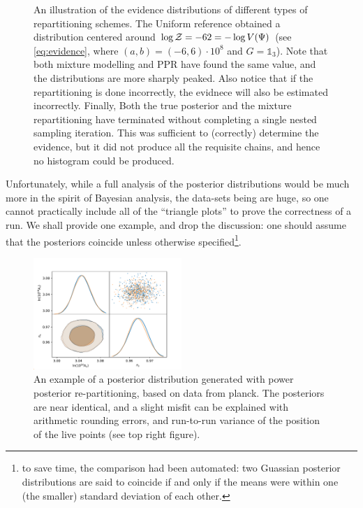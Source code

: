 \documentclass[usenatbib]{mnras}
\begin{document}
\begin{figure}

\caption{\label{org39c567e}
An illustration of the evidence distributions of different types of repartitioning schemes. The Uniform reference obtained a distribution centered around \(\log {\cal Z} = -62 = - \log V(\Psi)\) (see \autoref{eq:evidence}, where \((a,b)=(-6, 6)\cdot 10^{8}\) and \(G=\mathds{1}_{3}\)). Note that both mixture modelling and PPR have found the same value, and the distributions are more sharply peaked. Also notice that if the repartitioning is done incorrectly, the evidnece will also be estimated incorrectly. Finally, Both the true posterior and the mixture repartitioning have terminated without completing a single nested sampling iteration. This was sufficient to (correctly) determine the evidence, but it did not produce all the requisite chains, and hence no histogram could be produced.}
\end{figure}

Unfortunately, while a full analysis of the posterior distributions
would be much more in the spirit of Bayesian analysis, the data-sets
being are huge, so one cannot practically include all of
the ``triangle plots'' to prove the correctness of a run. We shall
provide one example, and drop the discussion: one should assume
that the posteriors coincide unless otherwise specified\footnote{to save time, the comparison had been automated: two Guassian
posterior distributions are said to coincide if and only if the means
were within one (the smaller) standard deviation  of each
other.}. 

\begin{figure}
 \includegraphics[width=0.5\textwidth]{./illustrations/misfit.pdf}
\caption{\label{org7fac775}
An example of a posterior distribution generated with power posterior re-partitioning, based on data from planck. The posteriors are near identical, and a slight misfit can be explained with arithmetic rounding errors, and run-to-run variance of the position of the live points (see top right figure).}
\end{figure}
\end{document}
